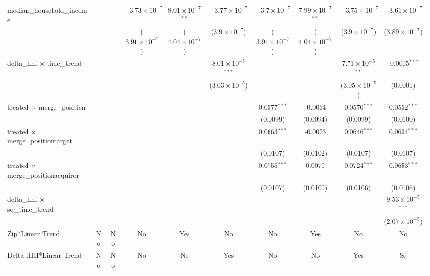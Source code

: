 \begin{table}[H]
{\begin{tabular}{lccccccccc}
 median\_household\_income&   &    & $-3.73\times 10^{-7}$ & $8.01\times 10^{-7}$$^{**}$ & $-3.77\times 10^{-7}$ & $-3.7\times 10^{-7}$ & $7.99\times 10^{-7}$$^{**}$ & $-3.75\times 10^{-7}$ & $-3.61\times 10^{-7}$\\ 

   &   &    & ($3.91\times 10^{-7}$) & ($4.04\times 10^{-7}$) & ($3.9\times 10^{-7}$) & ($3.91\times 10^{-7}$) & ($4.04\times 10^{-7}$) & ($3.9\times 10^{-7}$) & ($3.89\times 10^{-7}$)\\ 

 delta\_hhi $\times $ time\_trend&   &    &    &    & $8.01\times 10^{-5}$$^{***}$ &    &    & $7.71\times 10^{-5}$$^{**}$ & -0.0005$^{***}$\\ 

   &   &    &    &    & ($3.03\times 10^{-5}$) &    &    & ($3.05\times 10^{-5}$) & (0.0001)\\ 

 treated $\times $ merge\_position&   &    &    &    &    & 0.0577$^{***}$ & -0.0034 & 0.0570$^{***}$ & 0.0552$^{***}$\\ 

   &   &    &    &    &    & (0.0099) & (0.0094) & (0.0099) & (0.0100)\\ 

 treated $\times $ merge\_positiontarget&   &    &    &    &    & 0.0663$^{***}$ & -0.0023 & 0.0646$^{***}$ & 0.0604$^{***}$\\ 

   &   &    &    &    &    & (0.0107) & (0.0102) & (0.0107) & (0.0107)\\ 

 treated $\times $ merge\_positionacquiror&   &    &    &    &    & 0.0755$^{***}$ & 0.0070 & 0.0724$^{***}$ & 0.0653$^{***}$\\ 

   &   &    &    &    &    & (0.0107) & (0.0100) & (0.0106) & (0.0106)\\ 

 delta\_hhi $\times $ sq\_time\_trend&   &    &    &    &    &    &    &    & $9.53\times 10^{-5}$$^{***}$\\ 

   &   &    &    &    &    &    &    &    & ($2.07\times 10^{-5}$)\\ 

 Zip*Linear Trend & No & No & No & Yes & No & No & Yes & No & No\\ 

 Delta HHI*Linear Trend & No & No & No & No & Yes & No & No & Yes & Sq\\ 


\end{tabular}}
\end{table}
